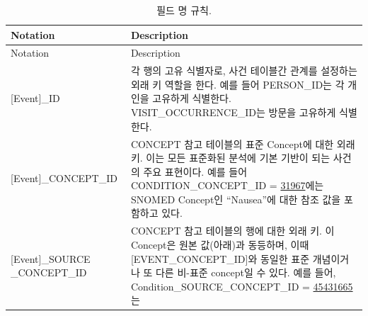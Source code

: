 \documentclass[11pt]{book}
\theoremstyle{definition}
\theoremstyle{definition}
\theoremstyle{definition}
\theoremstyle{remark}
\begin{document}
\begin{longtable}[]{@{}ll@{}}
\caption{\label{tab:fieldConventions} 필드 명 규칙.}\tabularnewline
\toprule
\begin{minipage}[b]{0.34\columnwidth}\raggedright\strut
Notation\strut
\end{minipage} & \begin{minipage}[b]{0.60\columnwidth}\raggedright\strut
Description\strut
\end{minipage}\tabularnewline
\midrule
\endfirsthead
\toprule
\begin{minipage}[b]{0.34\columnwidth}\raggedright\strut
Notation\strut
\end{minipage} & \begin{minipage}[b]{0.60\columnwidth}\raggedright\strut
Description\strut
\end{minipage}\tabularnewline
\midrule
\endhead
\begin{minipage}[t]{0.34\columnwidth}\raggedright\strut
{[}Event{]}\_ID\strut
\end{minipage} & \begin{minipage}[t]{0.60\columnwidth}\raggedright\strut
각 행의 고유 식별자로, 사건 테이블간 관계를 설정하는 외래 키 역할을
한다. 예를 들어 PERSON\_ID는 각 개인을 고유하게 식별한다.
VISIT\_OCCURRENCE\_ID는 방문을 고유하게 식별한다.\strut
\end{minipage}\tabularnewline
\begin{minipage}[t]{0.34\columnwidth}\raggedright\strut
{[}Event{]}\_CONCEPT\_ID\strut
\end{minipage} & \begin{minipage}[t]{0.60\columnwidth}\raggedright\strut
CONCEPT 참고 테이블의 표준 Concept에 대한 외래 키. 이는 모든 표준화된
분석에 기본 기반이 되는 사건의 주요 표현이다. 예를 들어
CONDITION\_CONCEPT\_ID =
\href{http://athena.ohdsi.org/search-terms/terms/31967}{31967}에는
SNOMED Concept인 ``Nausea''에 대한 참조 값을 포함하고 있다.\strut
\end{minipage}\tabularnewline
\begin{minipage}[t]{0.34\columnwidth}\raggedright\strut
{[}Event{]}\_SOURCE \_CONCEPT\_ID\strut
\end{minipage} & \begin{minipage}[t]{0.60\columnwidth}\raggedright\strut
CONCEPT 참고 테이블의 행에 대한 외래 키. 이 Concept은 원본 값(아래)과
동등하며, 이때 {[}EVENT\_CONCEPT\_ID{]}와 동일한 표준 개념이거나 또 다른
비-표준 concept일 수 있다. 예를 들어, Condition\_SOURCE\_CONCEPT\_ID =
\href{http://athena.ohdsi.org/search-terms/terms/45431665}{45431665}는

\end{minipage}
\end{longtable}
\end{document}
